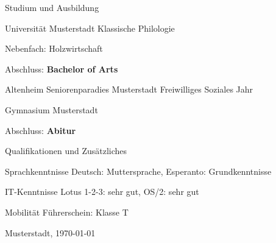 \documentclass{germancv}
\begin{document}
\begin{cvsection}{Studium und Ausbildung}
  \begin{cvitemlist}
      {}
      {Universität}
      {Musterstadt}
      {Klassische Philologie}
      {}
    \item Nebenfach: Holzwirtschaft
    \item Abschluss: \textbf{Bachelor of Arts}
  \end{cvitemlist}
  \begin{cvitem}
      {}
      {Altenheim Seniorenparadies}
      {Musterstadt}
      {Freiwilliges Soziales Jahr}
      {}
  \end{cvitem}
  \begin{cvitemlist}
      {}
      {Gymnasium}
      {Musterstadt}
      {}
      {}
    \item Abschluss: \textbf{Abitur}
  \end{cvitemlist}
\end{cvsection}

\pagebreak

\begin{cvsection}{Qualifikationen und Zusätzliches}
  \begin{cvitemplain}{Sprachkenntnisse}
    Deutsch: Muttersprache, Esperanto: Grundkenntnisse
  \end{cvitemplain}
  \begin{cvitemplain}{IT-Kenntnisse}
    Lotus 1-2-3: sehr gut, OS/2: sehr gut
  \end{cvitemplain}
  \begin{cvitemplain}{Mobilität}
    Führerschein: Klasse T
  \end{cvitemplain}
\end{cvsection}

\vspace{3em}

\begin{flushleft}
  Musterstadt, \today
\end{flushleft}
\end{document}
